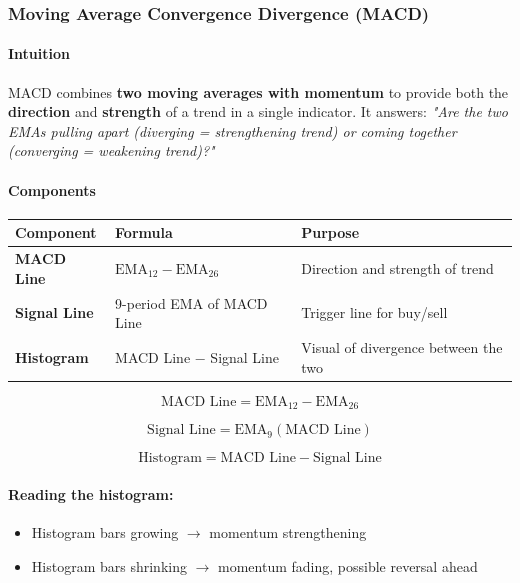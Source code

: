 \documentclass[12pt,openany]{book}
\begin{document}
\subsubsection{Moving Average Convergence Divergence (MACD)}

\paragraph{Intuition}
MACD combines \textbf{two moving averages with momentum} to provide both the \textbf{direction} and \textbf{strength} of a trend in a single indicator. It answers: \emph{"Are the two EMAs pulling apart (diverging = strengthening trend) or coming together (converging = weakening trend)?"}

\paragraph{Components}

\begin{center}
\small
\renewcommand{\arraystretch}{1.2}
\begin{tabular}{|L{0.25\textwidth}|L{0.34\textwidth}|L{0.31\textwidth}|}
\hline
 \textbf{Component} & \textbf{Formula} & \textbf{Purpose} \\ \hline
 \textbf{MACD Line} & \(\text{EMA}_{12} - \text{EMA}_{26}\) & Direction and strength of trend \\ \hline
 \textbf{Signal Line} & 9-period EMA of MACD Line & Trigger line for buy/sell \\ \hline
 \textbf{Histogram} & MACD Line \(-\) Signal Line & Visual of divergence between the two \\ \hline
\end{tabular}
\end{center}

\[
\text{MACD Line} = \text{EMA}_{12} - \text{EMA}_{26}
\]

\[
\text{Signal Line} = \text{EMA}_9(\text{MACD Line})
\]

\[
\text{Histogram} = \text{MACD Line} - \text{Signal Line}
\]

\paragraph{Reading the histogram:}
\begin{itemize}[leftmargin=*]
    \item Histogram bars growing \(\rightarrow\) momentum strengthening
    \item Histogram bars shrinking \(\rightarrow\) momentum fading, possible reversal ahead
\end{itemize}
\end{document}
